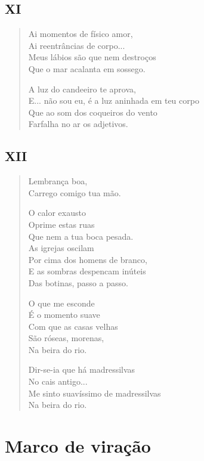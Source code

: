 \pagebreak
\section{XI}

\begin{verse}
Ai momentos de físico amor,\\
Ai reentrâncias de corpo...\\
Meus lábios são que nem destroços\\
Que o mar acalanta em sossego.

A luz do candeeiro te aprova,\\
E... não sou eu, é a luz aninhada em teu corpo\\
Que ao som dos coqueiros do vento\\
Farfalha no ar os adjetivos.
\end{verse}

\pagebreak
\section{XII}

\begin{verse}
Lembrança boa,\\
Carrego comigo tua mão.

O calor exausto\\
Oprime estas ruas\\
Que nem a tua boca pesada.\\
As igrejas oscilam\\
Por cima dos homens de branco,\\
E as sombras despencam inúteis\\
Das botinas, passo a passo.

O que me esconde\\
É o momento suave\\
Com que as casas velhas\\
São róseas, morenas,\\
Na beira do rio.

Dir-se-ia que há madressilvas\\
No cais antigo...\\
Me sinto suavíssimo de madressilvas\\
Na beira do rio.
\end{verse}


\chapter[\textsc{marco de viração}\\Improviso do mal da América]{Marco de viração}

